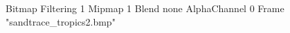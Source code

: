 {Bitmap
	{Filtering 1}
	{Mipmap 1}
	{Blend none}
	{AlphaChannel 0}
	{Frame "sandtrace_tropics2.bmp"}
}

